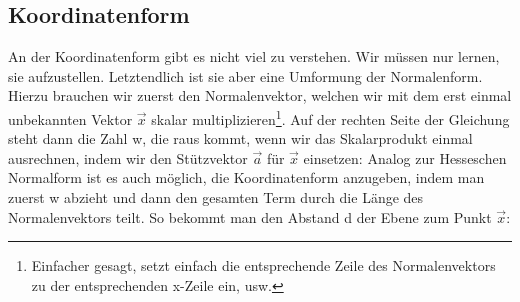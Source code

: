 	\subsection{Koordinatenform}
		An der Koordinatenform gibt es nicht viel zu verstehen. Wir müssen nur lernen,
		sie aufzustellen. Letztendlich ist sie aber eine Umformung der Normalenform.
		Hierzu brauchen wir zuerst den Normalenvektor, welchen wir mit dem erst einmal
		unbekannten Vektor \(\vec{x}\) skalar multiplizieren\footnote{Einfacher
		gesagt, setzt einfach die entsprechende Zeile des Normalenvektors zu der
		entsprechenden x-Zeile ein, usw.}. Auf der rechten Seite der Gleichung steht
		dann die Zahl w, die raus kommt, wenn wir das Skalarprodukt einmal ausrechnen,
		indem wir den Stützvektor \(\vec{a}\) für \(\vec{x}\) einsetzen:
		\formel{\[n_1x_1+n_2x_2+n_3x_3=w \mathrm{\ (anders\ geschrieben\ }
		\vec{n}\cdot \vec{x}=w)\]}
		Analog zur Hesseschen Normalform ist es auch möglich, die
		Koordinatenform anzugeben, indem man zuerst w abzieht und dann den gesamten
		Term durch die Länge des Normalenvektors teilt. So bekommt man den Abstand d
		der Ebene zum Punkt \(\vec{x}\):
		\formel{\[\frac{n_1x_1+n_2x_2+n_3x_3-w}{|\vec{n}|}=d\]}
